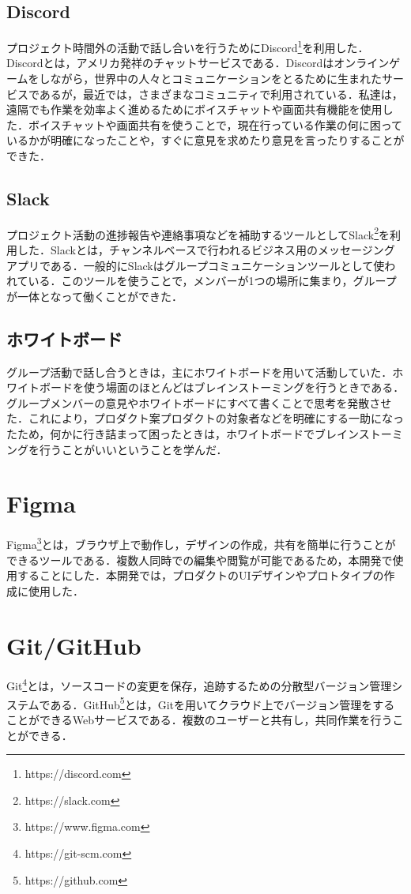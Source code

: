 \subsection{Discord}
プロジェクト時間外の活動で話し合いを行うためにDiscord\footnote{https://discord.com}を利用した．Discordとは，アメリカ発祥のチャットサービスである．Discordはオンラインゲームをしながら，世界中の人々とコミュニケーションをとるために生まれたサービスであるが，最近では，さまざまなコミュニティで利用されている．私達は，遠隔でも作業を効率よく進めるためにボイスチャットや画面共有機能を使用した．ボイスチャットや画面共有を使うことで，現在行っている作業の何に困っているかが明確になったことや，すぐに意見を求めたり意見を言ったりすることができた．

\subsection{Slack}
プロジェクト活動の進捗報告や連絡事項などを補助するツールとしてSlack\footnote{https://slack.com}を利用した．Slackとは，チャンネルベースで行われるビジネス用のメッセージングアプリである．一般的にSlackはグループコミュニケーションツールとして使われている．このツールを使うことで，メンバーが1つの場所に集まり，グループが一体となって働くことができた．

\subsection{ホワイトボード}
グループ活動で話し合うときは，主にホワイトボードを用いて活動していた．ホワイトボードを使う場面のほとんどはブレインストーミングを行うときである．グループメンバーの意見やホワイトボードにすべて書くことで思考を発散させた．これにより，プロダクト案プロダクトの対象者などを明確にする一助になったため，何かに行き詰まって困ったときは，ホワイトボードでブレインストーミングを行うことがいいということを学んだ．

\section{Figma}
Figma\footnote{https://www.figma.com}とは，ブラウザ上で動作し，デザインの作成，共有を簡単に行うことができるツールである．複数人同時での編集や閲覧が可能であるため，本開発で使用することにした．本開発では，プロダクトのUIデザインやプロトタイプの作成に使用した．

\section{Git/GitHub}
Git\footnote{https://git-scm.com}とは，ソースコードの変更を保存，追跡するための分散型バージョン管理システムである．GitHub\footnote{https://github.com}とは，Gitを用いてクラウド上でバージョン管理をすることができるWebサービスである．複数のユーザーと共有し，共同作業を行うことができる．



